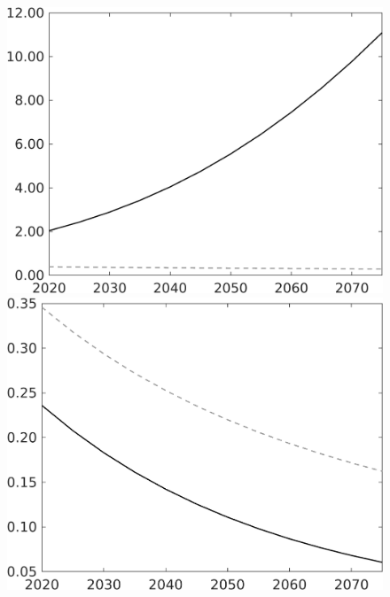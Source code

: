 \documentclass[12pt]{article}
\begin{document}
\begin{figure}
\begin{minipage}[]{0.32\textwidth}
	\end{minipage}
	\begin{minipage}[]{0.32\textwidth}
		\includegraphics[width=1\textwidth]{../../codding_model/own_basedOnFried/optimalPol_010922_revision/figures/all_13Sept22/LevTaufNoTauf_TaulCalib_Equlab_regime0_LgLf_spillover0_nsk0_xgr0_knspil1_sep1_LFlimit0_emsbase0_countec0_GovRev0_etaa0.79_lgd0.png}
	\end{minipage}
\begin{minipage}[]{0.32\textwidth}
\includegraphics[width=1\textwidth]{../../codding_model/own_basedOnFried/optimalPol_010922_revision/figures/all_13Sept22/LevTaufNoTauf_TaulCalib_Equlab_regime0_sff_spillover0_nsk0_xgr0_knspil1_sep1_LFlimit0_emsbase0_countec0_GovRev0_etaa0.79_lgd0.png}

\end{minipage}
\end{figure}
\end{document}
